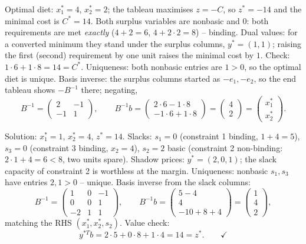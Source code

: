 \begin{solutions}
  \item Optimal diet: $x_{1}^{*}=4$, $x_{2}^{*}=2$; the tableau maximises
        $z=-C$, so $z^{*}=-14$ and the minimal cost is $C^{*}=14$. Both
        surplus variables are nonbasic and $0$: both requirements are met
        \emph{exactly} ($4+2=6$, $4+2\cdot 2=8$) -- binding. Dual values:
        for a converted minimum they stand under the surplus columns,
        $y^{*}=(1,1)$; raising the first (second) requirement by one unit
        raises the minimal cost by $1$. Check:
        $1\cdot 6+1\cdot 8=14=C^{*}$. Uniqueness: both nonbasic entries
        are $1>0$, so the optimal diet is unique. Basis inverse: the
        surplus columns started as $-e_{1},-e_{2}$, so the end tableau
        shows $-B^{-1}$ there; negating,
        \[
          B^{-1}=
          \begin{pmatrix}
            2 & -1\\
            -1 & 1
          \end{pmatrix},
          \qquad
          B^{-1}b=
          \begin{pmatrix}
            2\cdot 6-1\cdot 8\\
            -1\cdot 6+1\cdot 8
          \end{pmatrix}
          =\begin{pmatrix}4\\2\end{pmatrix}
          =\begin{pmatrix}x_{1}^{*}\\x_{2}^{*}\end{pmatrix}.
        \]

  \item Solution: $x_{1}^{*}=1$, $x_{2}^{*}=4$, $z^{*}=14$. Slacks:
        $s_{1}=0$ (constraint 1 binding, $1+4=5$), $s_{3}=0$ (constraint 3
        binding, $x_{2}=4$), $s_{2}=2$ basic (constraint 2 non-binding:
        $2\cdot 1+4=6<8$, two units spare). Shadow prices:
        $y^{*}=(2,0,1)$; the slack capacity of constraint 2 is worthless
        at the margin. Uniqueness: nonbasic $s_{1},s_{3}$ have entries
        $2,1>0$ -- unique. Basis inverse from the slack columns:
        \[
          B^{-1}=
          \begin{pmatrix}
            1 & 0 & -1\\
            0 & 0 & 1\\
            -2 & 1 & 1
          \end{pmatrix},
          \qquad
          B^{-1}b=
          \begin{pmatrix}
            5-4\\ 4\\ -10+8+4
          \end{pmatrix}
          =\begin{pmatrix}1\\4\\2\end{pmatrix},
        \]
        matching the RHS $(x_{1}^{*},x_{2}^{*},s_{2})$. Value check:
        \[
          y^{*T}b=2\cdot 5+0\cdot 8+1\cdot 4=14=z^{*}. \qquad\checkmark
        \]
\end{solutions}

